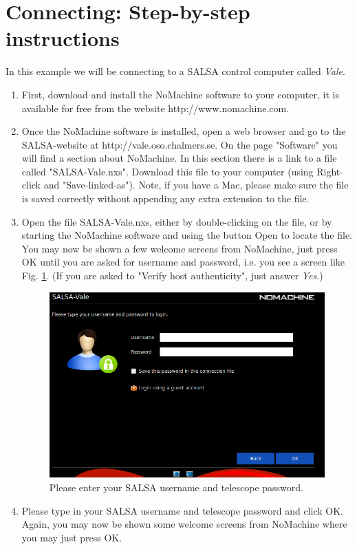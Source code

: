 \section{Connecting: Step-by-step instructions}
In this example we will be connecting to a SALSA control computer called \emph{Vale}.
\begin{enumerate}
	\item First, download and install the NoMachine software to your computer, it is available for free
			from the website http://www.nomachine.com. 
\item Once the NoMachine software is installed, open a web browser and go to
	the SALSA-website at http://vale.oso.chalmers.se. On the page "Software"
	you will find a section about NoMachine.  In this section there is a link
	to a file called "SALSA-Vale.nxs". Download this file to your computer
	(using Right-click and "Save-linked-as"). Note, if you have a Mac, please make
	sure the file is saved correctly without appending any extra extension to the file.
\item Open the file SALSA-Vale.nxs, either by double-clicking on the file, or by starting
	the NoMachine software and using the button Open to locate the file. You may now be shown
	a few welcome screens from NoMachine, just press OK until you are asked for username and password,
	i.e. you see a screen like Fig. \ref{fig:login}. (If you are asked to "Verify host authenticity",
just answer \emph{Yes}.)
\begin{figure}[H]
    \centering
    \includegraphics[height=0.5\textwidth]{../figures/nomachinefigs/SALSA_login.png}
    \caption{Please enter your SALSA username and telescope password.}
    \label{fig:login}
\end{figure}
\item Please type in your SALSA username and telescope password and click OK. Again, you may now
	be shown some welcome screens from NoMachine where you may just press OK. 

\end{enumerate}

